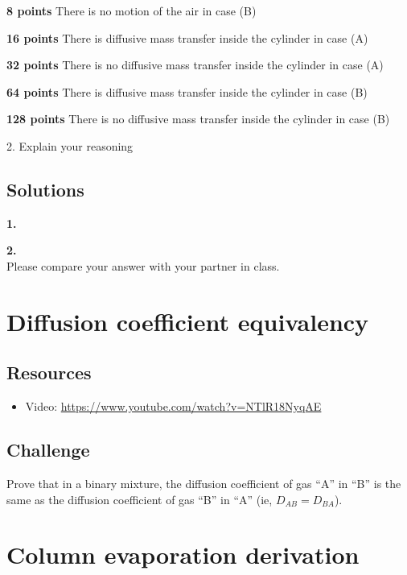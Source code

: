 \textbf{8 points} There is no motion of the air in case (B)

\textbf{16 points} There is diffusive mass transfer inside the cylinder in case (A)

\textbf{32 points} There is no diffusive mass transfer inside the cylinder in case (A)

\textbf{64 points} There is diffusive mass transfer inside the cylinder in case (B)

\textbf{128 points} There is no diffusive mass transfer inside the cylinder in case (B)

\vspace{1cm}
2. Explain your reasoning

\subsection*{Solutions}
\textbf{1.}\\

\textbf{2.}\\
Please compare your answer with your partner in class.




\newpage
\section{Diffusion coefficient equivalency}

\subsection*{Resources}
\begin{itemize}
    \item Video: \url{https://www.youtube.com/watch?v=NTlR18NyqAE}
\end{itemize}

\subsection*{Challenge}
Prove that in a binary mixture, the diffusion coefficient of gas ``A'' in ``B'' is the same as the diffusion coefficient of gas ``B'' in ``A'' (ie, $D_{AB} = D_{BA}$).



\iffalse
\newpage
\section{Column evaporation derivation}

